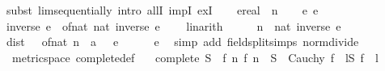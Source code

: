 \begin{isabellebody}
%
\isadelimproof
%
\endisadelimproof
%
\isatagproof
{}\isamarkupfalse%
\ {\isacharparenleft}{\kern0pt}subst\ lim{\isacharunderscore}{\kern0pt}sequentially{\isacharcomma}{\kern0pt}\ intro\ allI\ impI\ exI{\isacharparenright}{\kern0pt}\isanewline
\ \ \isamarkupfalse%
\ e{\isacharcolon}{\kern0pt}{\isacharcolon}{\kern0pt}real\ \ n\isanewline
\ \ \isamarkupfalse%
\ e{\isacharcolon}{\kern0pt}\ {\isachardoublequoteopen}e\ {\isachargreater}{\kern0pt}\ {}{\isachardoublequoteclose}\ \isanewline
\ \ \isamarkupfalse%
\ {\isachardoublequoteopen}inverse\ e\ {\isacharless}{\kern0pt}\ of{\isacharunderscore}{\kern0pt}nat\ {\isacharparenleft}{\kern0pt}nat\ {\isasymlceil}inverse\ e\ {\isacharplus}{\kern0pt}\ {}{\isasymrceil}{\isacharparenright}{\kern0pt}{\isachardoublequoteclose}\ \isamarkupfalse%
\ linarith\isanewline
\ \ \isamarkupfalse%
\ \isamarkupfalse%
\ {\isachardoublequoteopen}n\ {\isasymge}\ nat\ {\isasymlceil}inverse\ e\ {\isacharplus}{\kern0pt}\ {}{\isasymrceil}{\isachardoublequoteclose}\isanewline
\ \ \isamarkupfalse%
\ \isamarkupfalse%
\ {\isachardoublequoteopen}dist\ {\isacharparenleft}{\kern0pt}{}\ {\isacharslash}{\kern0pt}\ of{\isacharunderscore}{\kern0pt}nat\ n\ {\isacharcolon}{\kern0pt}{\isacharcolon}{\kern0pt}\ {\isacharprime}{\kern0pt}a{\isacharparenright}{\kern0pt}\ {}\ {\isacharless}{\kern0pt}\ e{\isachardoublequoteclose}\isanewline
\ \ \ \ \isamarkupfalse%
\ e\ \isamarkupfalse%
\ {\isacharparenleft}{\kern0pt}simp\ add{\isacharcolon}{\kern0pt}\ field{\isacharunderscore}{\kern0pt}split{\isacharunderscore}{\kern0pt}simps\ norm{\isacharunderscore}{\kern0pt}divide{\isacharparenright}{\kern0pt}\isanewline
{}\isamarkupfalse%
%
\endisatagproof
{\isafoldproof}%
%
\isadelimproof
\isanewline
%
\endisadelimproof
\isanewline
{}\isamarkupfalse%
\ {\isacharparenleft}{\kern0pt}\ metric{\isacharunderscore}{\kern0pt}space{\isacharparenright}{\kern0pt}\ complete{\isacharunderscore}{\kern0pt}def{\isacharcolon}{\kern0pt}\isanewline
\ \ \ {\isachardoublequoteopen}complete\ S\ {\isacharequal}{\kern0pt}\ {\isacharparenleft}{\kern0pt}{\isasymforall}f{\isachardot}{\kern0pt}\ {\isacharparenleft}{\kern0pt}{\isasymforall}n{\isachardot}{\kern0pt}\ f\ n\ {\isasymin}\ S{\isacharparenright}{\kern0pt}\ {\isasymand}\ Cauchy\ f\ {\isasymlongrightarrow}\ {\isacharparenleft}{\kern0pt}{\isasymexists}l{\isasymin}S{\isachardot}{\kern0pt}\ f\ {\isasymlonglonglongrightarrow}\ l{\isacharparenright}{\kern0pt}{\isacharparenright}{\kern0pt}{\isachardoublequoteclose}\isanewline

\end{isabellebody}
